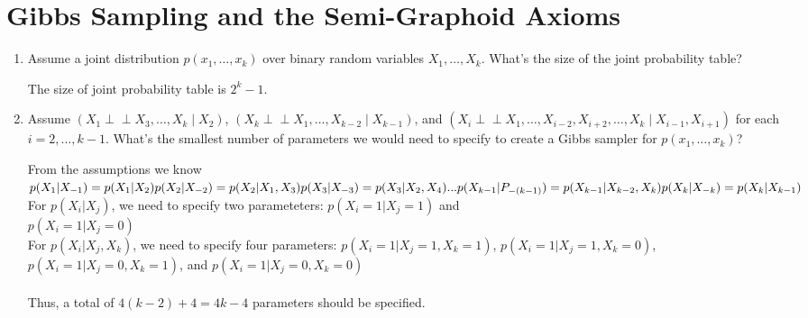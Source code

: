 \documentclass[11pt]{article}
\begin{document}
\pagebreak
\section{Gibbs Sampling and the Semi-Graphoid Axioms}

\begin{enumerate}
\item Assume a joint distribution $p(x_1, \ldots, x_k)$ over binary random variables $X_1, \ldots, X_k$.
What's the size of the joint probability table?\\
\begin{answertext}{3cm}{}

The size of joint probability table is $2^{k}-1$.

\end{answertext}

\item Assume $(X_1 {\perp\!\!\!\perp} X_3, \ldots, X_k \mid X_2)$, $(X_k {\perp\!\!\!\perp} X_1, \ldots, X_{k-2} \mid X_{k-1})$, and $(X_i {\perp\!\!\!\perp} X_1, \ldots, X_{i-2}, X_{i+2}, \ldots, X_k \mid X_{i-1}, X_{i+1})$ for each $i = 2, \ldots, k-1$.  What's the smallest number of parameters we would need to specify to create a Gibbs sampler for $p(x_1, \ldots, x_k)$?\\
\begin{answertext}{8cm}{}

From the assumptions we know \\
$ p(X_{1}|X_{-1})=p(X_{1}|X_{2}) \notag\\
p(X_{2}|X_{-2})=p(X_{2}|X_{1},X_{3}) \notag\\
p(X_{3}|X_{-3})=p(X_{3}|X_{2},X_{4}) \notag\\
... \\
p(X_{k-1}|P_{-(k-1)})=p(X_{k-1}|X_{k-2},X_{k}) \notag\\
p(X_{k}|X_{-k})=p(X_{k}|X_{k-1}) \notag\\
$
\\
For $p(X_{i}|X_{j})$, we need to specify two parameteters: $p(X_{i}=1|X_{j}=1)$ and \\ $p(X_{i}=1|X_{j}=0)$ \\
For $p(X_{i}|X_{j},X_{k})$, we need to specify four parameters: $p(X_{i}=1|X_{j}=1,X_{k}=1)$, $p(X_{i}=1|X_{j}=1,X_{k}=0)$, $p(X_{i}=1|X_{j}=0,X_{k}=1)$, and $p(X_{i}=1|X_{j}=0,X_{k}=0)$ \\
\\
Thus, a total of $4(k-2)+4=4k-4$ parameters should be specified.

\end{answertext}


\end{enumerate}
\end{document}
